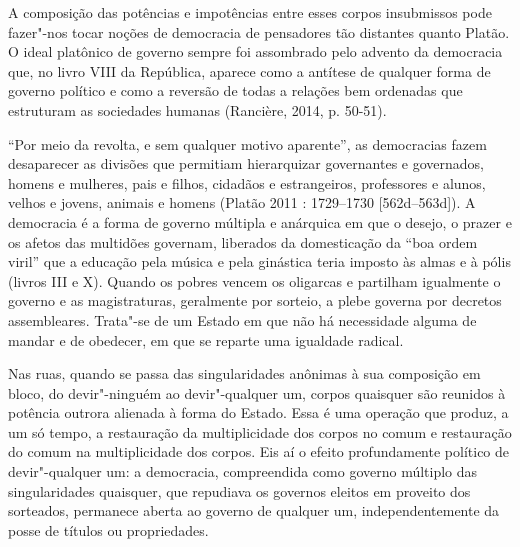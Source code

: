 A composição das potências e impotências entre esses corpos insubmissos
pode fazer"-nos tocar noções de democracia de pensadores tão distantes
quanto Platão. O ideal platônico de governo sempre foi assombrado pelo
advento da democracia que, no livro VIII da República, aparece como a
antítese de qualquer forma de governo político e como a reversão de
todas a relações bem ordenadas que estruturam as sociedades humanas
(Rancière, 2014, p. 50-51).

``Por meio da revolta, e sem qualquer motivo aparente'', as democracias
fazem desaparecer as divisões que permitiam hierarquizar governantes e
governados, homens e mulheres, pais e filhos, cidadãos e estrangeiros,
professores e alunos, velhos e jovens, animais e homens (Platão 2011 :
1729--1730 {[}562d--563d{]}). A democracia é a forma de governo múltipla e
anárquica em que o desejo, o prazer e os afetos das multidões governam,
liberados da domesticação da ``boa ordem viril'' que a educação pela
música e pela ginástica teria imposto às almas e à pólis (livros III e
X). Quando os pobres vencem os oligarcas e partilham igualmente o
governo e as magistraturas, geralmente por sorteio, a plebe governa por
decretos assembleares. Trata"-se de um Estado em que não há necessidade
alguma de mandar e de obedecer, em que se reparte uma igualdade radical.

Nas ruas, quando se passa das singularidades anônimas à sua composição
em bloco, do devir"-ninguém ao devir"-qualquer um, corpos quaisquer são
reunidos à potência outrora alienada à forma do Estado. Essa é uma
operação que produz, a um só tempo, a restauração da multiplicidade dos
corpos no comum e restauração do comum na multiplicidade dos corpos. Eis
aí o efeito profundamente político de devir"-qualquer um: a democracia,
compreendida como governo múltiplo das singularidades quaisquer, que
repudiava os governos eleitos em proveito dos sorteados, permanece
aberta ao governo de qualquer um, independentemente da posse de títulos
ou propriedades.

